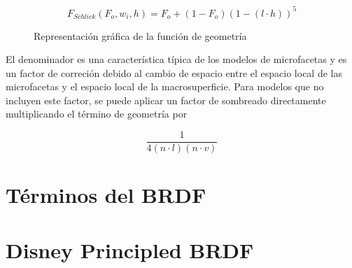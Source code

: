    $$
    F_{Schlick}(F_o, w_i, h) = F_o + (1 - F_o) (1 - (l\cdot{h}))^5
    $$

    \begin{figure}[H]
        \vspace{0.5cm}
        \centering
        \caption{Representaci\'on gr\'afica de la funci\'on de geometr\'ia}
    \end{figure}
    \singlespacing

    El denominador es una caracter\'istica t\'ipica de los modelos de microfacetas y es un factor de correci\'on debido al cambio
    de espacio entre el espacio local de las microfacetas y el espacio local de la macrosuperficie. Para modelos que no
    incluyen este factor, se puede aplicar un factor de sombreado directamente multiplicando el t\'ermino de geometr\'ia por

    \begin{equation}
    \frac{1}{4(n\cdot{l}) (n\cdot{v})}
    \end{equation}
    \singlespacing



\section{T\'erminos del BRDF}

\section{Disney Principled BRDF}

